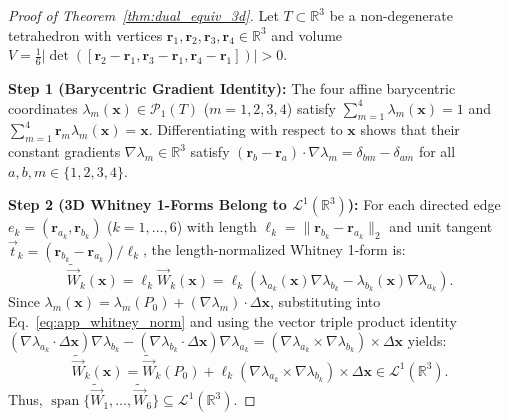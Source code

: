 \documentclass[preprint,12pt]{elsarticle}
\newcommand{\R}{\mathbb{R}}
\begin{document}
\begin{proof}[Proof of Theorem~\ref{thm:dual_equiv_3d}]
Let $T \subset \R^3$ be a non-degenerate tetrahedron with vertices $\mathbf{r}_1, \mathbf{r}_2, \mathbf{r}_3, \mathbf{r}_4 \in \R^3$ and volume $V = \frac{1}{6}|\det([\mathbf{r}_2-\mathbf{r}_1, \mathbf{r}_3-\mathbf{r}_1, \mathbf{r}_4-\mathbf{r}_1])| > 0$.

\textbf{Step 1 (Barycentric Gradient Identity):} The four affine barycentric coordinates $\lambda_m(\mathbf{x}) \in \mathcal{P}_1(T)$ ($m=1,2,3,4$) satisfy $\sum_{m=1}^4 \lambda_m(\mathbf{x}) = 1$ and $\sum_{m=1}^4 \mathbf{r}_m \lambda_m(\mathbf{x}) = \mathbf{x}$. Differentiating with respect to $\mathbf{x}$ shows that their constant gradients $\nabla\lambda_m \in \R^3$ satisfy $(\mathbf{r}_b - \mathbf{r}_a)\cdot\nabla\lambda_m = \delta_{bm} - \delta_{am}$ for all $a,b,m \in \{1,2,3,4\}$.

\textbf{Step 2 (3D Whitney 1-Forms Belong to $\mathcal{L}^1(\R^3)$):} For each directed edge $e_k = (\mathbf{r}_{a_k}, \mathbf{r}_{b_k})$ ($k=1,\dots,6$) with length $\ell_k = \|\mathbf{r}_{b_k} - \mathbf{r}_{a_k}\|_2$ and unit tangent $\vec{t}_k = (\mathbf{r}_{b_k} - \mathbf{r}_{a_k})/\ell_k$, the length-normalized Whitney 1-form is:
\begin{equation}
    \widetilde{\vec{W}}_k(\mathbf{x}) = \ell_k \vec{W}_k(\mathbf{x}) = \ell_k \left( \lambda_{a_k}(\mathbf{x})\nabla\lambda_{b_k} - \lambda_{b_k}(\mathbf{x})\nabla\lambda_{a_k} \right).
    \label{eq:app_whitney_norm}
\end{equation}
Since $\lambda_m(\mathbf{x}) = \lambda_m(P_0) + (\nabla\lambda_m)\cdot\Delta\mathbf{x}$, substituting into Eq.~\eqref{eq:app_whitney_norm} and using the vector triple product identity $(\nabla\lambda_{a_k}\cdot\Delta\mathbf{x})\nabla\lambda_{b_k} - (\nabla\lambda_{b_k}\cdot\Delta\mathbf{x})\nabla\lambda_{a_k} = (\nabla\lambda_{a_k} \times \nabla\lambda_{b_k}) \times \Delta\mathbf{x}$ yields:
\begin{equation}
    \widetilde{\vec{W}}_k(\mathbf{x}) = \widetilde{\vec{W}}_k(P_0) + \ell_k (\nabla\lambda_{a_k} \times \nabla\lambda_{b_k}) \times \Delta\mathbf{x} \in \mathcal{L}^1(\R^3).
    \label{eq:app_whitney_in_L1}
\end{equation}
Thus, $\operatorname{span}\{\widetilde{\vec{W}}_1, \dots, \widetilde{\vec{W}}_6\} \subseteq \mathcal{L}^1(\R^3)$.


\end{proof}
\end{document}
